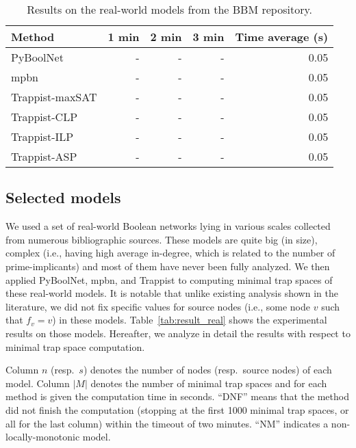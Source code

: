 \documentclass[preprint,12pt]{elsarticle}
\newcounter{rownumber}
\begin{document}
\setlength{\tabcolsep}{4pt}
\begin{table}[!h]
  \caption{Results on the real-world models from the BBM repository.}
  \centering%
  \label{tab:bbm_repo}
  \begin{tabular}{l||r|r|r||r}
    \toprule
    Method & 1 min & 2 min & 3 min & Time average (s) \\ \midrule
    PyBoolNet & - & - & - & 0.05 \\
    mpbn & - & - & - & 0.05 \\
    Trappist-maxSAT & - & - & - & 0.05 \\
    Trappist-CLP & - & - & - & 0.05 \\
    Trappist-ILP & - & - & - & 0.05 \\
    Trappist-ASP & - & - & - & 0.05 \\
    \bottomrule
  \end{tabular}
\end{table}
\setcounter{rownumber}{0}

\subsection{Selected models}

We used a set of real-world Boolean networks lying in various scales collected from numerous bibliographic sources.
These models are quite big (in size), complex (i.e., having high average in-degree, which is related to the number of prime-implicants) and most of them have never been fully analyzed.
We then applied PyBoolNet, mpbn, and Trappist to computing minimal trap spaces of these real-world models.
It is notable that unlike existing analysis shown in the literature, we did not fix specific values for source nodes (i.e., some node \(v\) such that \(f_v = v\)) in these models.
Table~\ref{tab:result_real} shows the experimental results on those models. Hereafter, we analyze in detail the results with respect to minimal trap space computation.

Column \(n\) (resp.\ \(s\)) denotes the number of nodes (resp.\ source nodes) of each model. Column \(|M|\) denotes the number of minimal trap spaces and for each method is given the computation time in seconds.
``DNF'' means that the method did not finish the computation (stopping at the first 1000 minimal trap spaces, or all for the last column) within the timeout of two minutes. ``NM'' indicates a non-locally-monotonic model.
    
\end{document}

